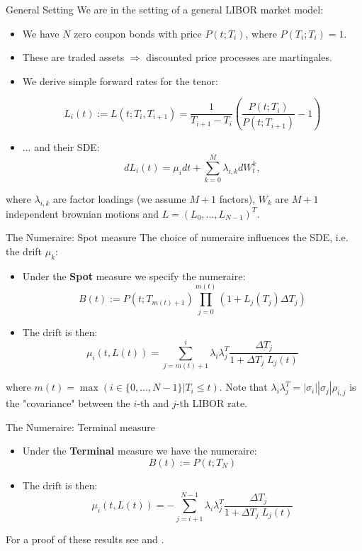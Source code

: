 \documentclass{beamer}
\begin{document}
	\begin{frame}{General Setting}
		We are in the setting of a general LIBOR market model:\\
		\begin{itemize}
			\item We have $N$ zero coupon bonds with price $P(t; T_i)$, where $P(T_i;T_i) = 1$.
			\item These are traded assets $\Rightarrow$ discounted price processes are martingales.
			\item We derive simple forward rates for the tenor:
			
			\[
			L_i(t) := L(t; T_i, T_{i+1}) = \frac{1}{T_{i+1} - 	T_i}\left(\frac{P(t;T_i)}{P(t;T_{i+1})} - 1\right)
			\]
			\par
			\item ... and their SDE:
			\[
			dL_i(t) = \mu _i dt + \sum_{k=0}^{M}\lambda _{i,k}dW^k_t,
			\]
		\end{itemize}
		where $\lambda_{i, k}$ are factor loadings (we assume $M + 1$ factors), $W_k$ are $M+1$ independent brownian motions and $L=(L_0, ..., L_{N-1})^T$.
	\end{frame}
	
	\begin{frame}{The Numeraire: Spot measure}
		The choice of numeraire influences the SDE, i.e. the drift $\mu_k$:\\
		\begin{itemize}
			\item Under the \textbf{Spot} measure we specify the numeraire:
			\[
			B(t) := P(t; T_{m\left( t\right)  + 1})\prod_{j=0}^{m\left( t\right) }(1+L_j(T_j)\Delta T_j)
			\]
			\item The drift is then:
			\[
			\mu_i(t, L(t)) = \sum_{j=m\left( t\right)  + 1}^{i} \lambda_{i}\lambda_{j}^T  \frac{\Delta T_j}{1 + \Delta T_j \;L_j(t)}
			\]
		
		\end{itemize}
			where $m(t) = \max(i \in \{0, ..., N-1\} | T_i \le t)$.
			Note that $\lambda_i \lambda^T_j = |\sigma_{i}| |\sigma_{j}| \rho_{i,j}$ is the "covariance" between the $i$-th and $j$-th LIBOR rate.
	\end{frame}
	
	\begin{frame}{The Numeraire: Terminal measure}
		\begin{itemize}
			\item Under the \textbf{Terminal} measure we have the numeraire:
			\[
			B(t) := P(t; T_{N})
			\]
			\item The drift is then:
			\[
			\mu_i(t, L(t)) = - \sum_{j=i+1}^{N-1} \lambda_{i}\lambda_{j}^T  \frac{\Delta T_j}{1 + \Delta T_j \;L_j(t)}
			\]
			
		\end{itemize}
		
		For a proof of these results see \cite{FriesBook} and \cite{fima3Lecture}.
	\end{frame}
	
\end{document}
